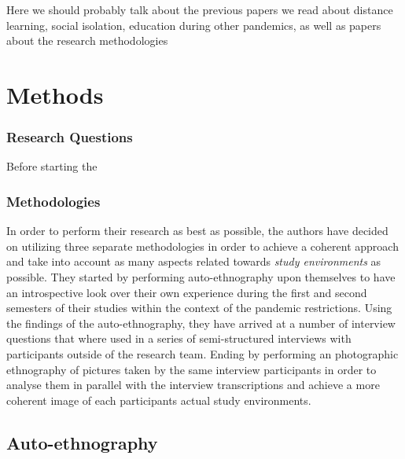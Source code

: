 \documentclass{sigchi}
\begin{document}
Here we should probably talk about the previous papers we read about distance learning, social isolation, education during other pandemics, as well as papers about the research methodologies

\section{Methods}

\subsubsection{Research Questions}
Before starting the 


\subsubsection{Methodologies}
In order to perform their research as best as possible, the authors have decided on utilizing three separate methodologies in order to achieve a coherent approach and take into account as many aspects related towards \emph{study environments} as possible. They started by performing auto-ethnography upon themselves to have an introspective look over their own experience during the first and second semesters of their studies within the context of the pandemic restrictions. Using the findings of the auto-ethnography, they have arrived at a number of interview questions that where used in a series of semi-structured interviews with participants outside of the research team. Ending by performing an photographic ethnography of pictures taken by the same interview participants in order to analyse them in parallel with the interview transcriptions and achieve a more coherent image of each participants actual study environments.

\subsection{Auto-ethnography}
\end{document}
